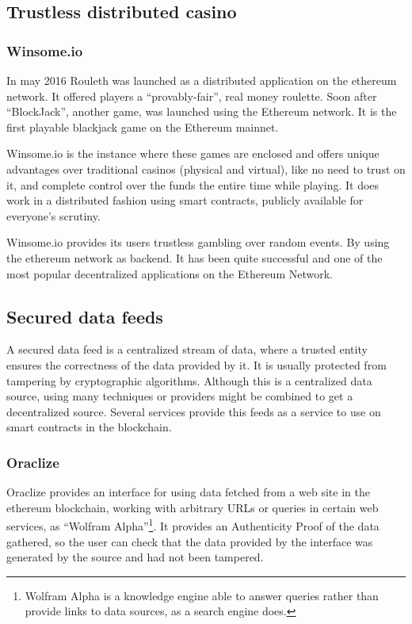 \subsection{Trustless distributed casino}

\subsubsection{Winsome.io}
In may 2016 Rouleth \cite{winsomeio} was launched as a distributed application
  on the ethereum network.
It offered players a ``provably-fair'', real money roulette.
Soon after ``BlockJack'', another game,  was launched using the Ethereum
  network.
It is the first playable blackjack game on the Ethereum mainnet.

Winsome.io is the instance where these games are enclosed and offers unique
  advantages over traditional casinos (physical and virtual), like no need to
  trust on it, and complete control over the funds the entire time while
  playing.
It does work in a distributed fashion using smart contracts, publicly available
  for everyone's scrutiny.

Winsome.io provides its users trustless gambling over random events.
By using the ethereum network as backend.
It has been quite successful and one of the most popular decentralized
  applications on the Ethereum Network.

\subsection{Secured data feeds}
A secured data feed is a centralized stream of data, where a trusted entity
  ensures the correctness of the data provided by it.
It is usually protected from tampering by cryptographic algorithms.
Although this is a centralized data source, using many techniques or providers
  might be combined to get a decentralized source.
Several services provide this feeds as a service to use on smart contracts in
  the blockchain.

\subsubsection{Oraclize}
Oraclize \cite{oraclizeit} provides an interface for using data fetched from a
  web site in the ethereum blockchain, working with arbitrary URLs or queries
  in certain web services, as ``Wolfram Alpha''\footnote{Wolfram Alpha is a
  knowledge engine able to answer queries rather than provide links to data
  sources, as a search engine does.}.
It provides an Authenticity Proof of the data gathered, so the user can check
  that the data provided by the interface was generated by the source and had
  not been tampered.

